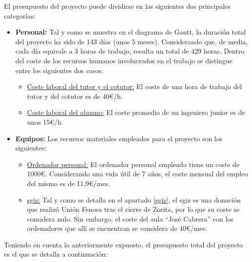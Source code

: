     El presupuesto del proyecto puede dividirse en las siguientes dos principales categorías:

    \begin{itemize}
      \item \textbf{Personal:} Tal y como se muestra en el diagrama de Gantt, la duración total del proyecto ha sido de 143 días (unos 5 meses). Considerando que, de media, cada día equivale a 3 horas de trabajo, resulta un total de 429 horas. Dentro del coste de los recursos humanos involucrados en el trabajo se distingue entre los siguientes dos casos:
      \begin{itemize}
        \item \underline{Coste laboral del tutor y el cotutor:} El coste de una hora de trabajo del tutor y del cotutor es de 40€/h.
        \item \underline{Coste laboral del alumno:} El coste promedio de un ingeniero junior es de unos 15€/h.
      \end{itemize} 
      \item \textbf{Equipos:} Los recursos materiales empleados para el proyecto son los siguientes:
      \begin{itemize}
        \item \underline{Ordenador personal:} El ordenador personal empleado tiene un coste de 1000€. Considerando una vida útil de 7 años, el coste mensual del empleo del mismo es de 11,9€/mes.
        \item \underline{\acrfull{sgiz}:} Tal y como se detalla en el apartado \ref{sgiz}, el \acrshort{sgiz} es una donación que realizó Unión Fenosa tras el cierre de Zorita, por lo que su coste se considera nulo. Sin embargo, el coste del aula ``José Cabrera'' con los ordenadores que allí se encuentran se considera de 40€/mes.
      \end{itemize}
    \end{itemize}
    
    Teniendo en cuenta lo anteriormente expuesto, el presupuesto total del proyecto es el que se detalla a continuación:
    
